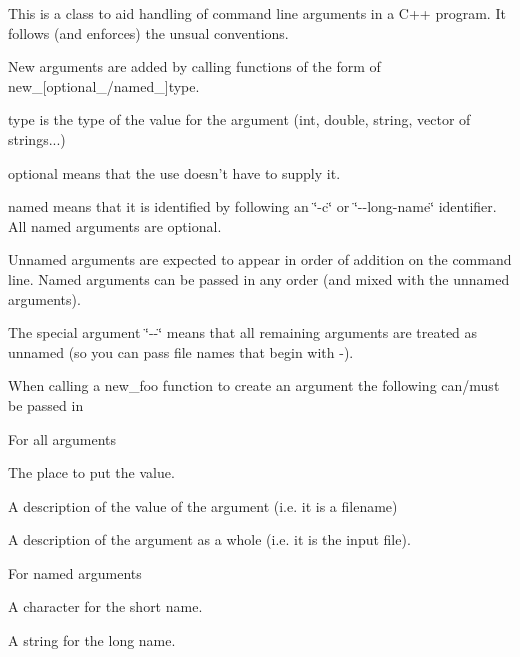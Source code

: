 This is a class to aid handling of command line arguments in a C++ program. It follows (and enforces) the unsual conventions.

New arguments are added by calling functions of the form of new\_\-\mbox{[}optional\_\-/named\_\-\mbox{]}type.


\begin{DoxyItemize}
\item type is the type of the value for the argument (int, double, string, vector of strings...)
\end{DoxyItemize}


\begin{DoxyItemize}
\item optional means that the use doesn't have to supply it.
\end{DoxyItemize}


\begin{DoxyItemize}
\item named means that it is identified by following an \char`\"{}-\/c\char`\"{} or \char`\"{}-\/-\/long-\/name\char`\"{} identifier. All named arguments are optional.
\end{DoxyItemize}

Unnamed arguments are expected to appear in order of addition on the command line. Named arguments can be passed in any order (and mixed with the unnamed arguments).

The special argument \char`\"{}-\/-\/\char`\"{} means that all remaining arguments are treated as unnamed (so you can pass file names that begin with -\/).

When calling a new\_\-foo function to create an argument the following can/must be passed in


\begin{DoxyItemize}
\item For all arguments
\begin{DoxyItemize}
\item The place to put the value.
\item A description of the value of the argument (i.e. it is a filename)
\item A description of the argument as a whole (i.e. it is the input file).
\end{DoxyItemize}
\end{DoxyItemize}


\begin{DoxyItemize}
\item For named arguments
\begin{DoxyItemize}
\item A character for the short name.
\item A string for the long name.
\end{DoxyItemize}
\end{DoxyItemize}

